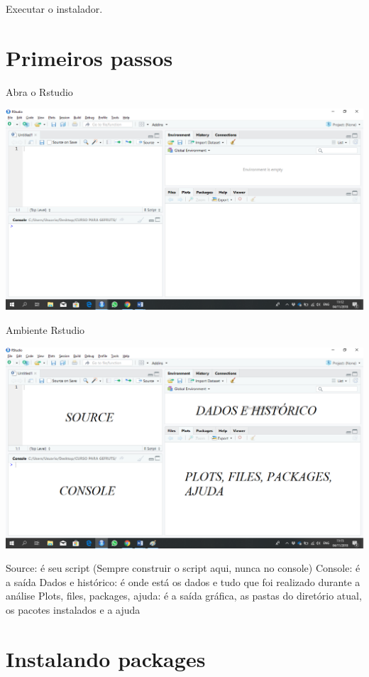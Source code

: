\documentclass[
]{book}
\begin{document}
Executar o instalador.

\hypertarget{primeiros-passos}{%
\section{Primeiros passos}\label{primeiros-passos}}

Abra o Rstudio

\includegraphics{install9.png}

Ambiente Rstudio

\includegraphics{install10.png}

Source: é seu script (Sempre construir o script aqui, nunca no console)
Console: é a saída
Dados e histórico: é onde está os dados e tudo que foi realizado durante a análise
Plots, files, packages, ajuda: é a saída gráfica, as pastas do diretório atual, os pacotes instalados e a ajuda

\hypertarget{instalando-packages}{%
\section{Instalando packages}\label{instalando-packages}}
\end{document}
